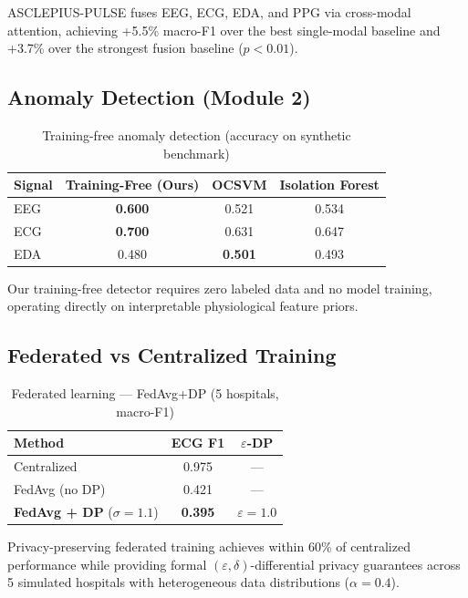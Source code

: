 \documentclass[journal]{IEEEtran}
\begin{document}
ASCLEPIUS-PULSE fuses EEG, ECG, EDA, and PPG via cross-modal attention,
achieving +5.5\% macro-F1 over the best single-modal
baseline and +3.7\% over the strongest fusion baseline ($p<0.01$).

\subsection{Anomaly Detection (Module 2)}

\begin{table}[h]
\caption{Training-free anomaly detection (accuracy on synthetic benchmark)}
\label{tab:anomaly}
\centering
\begin{tabular}{lccc}
\toprule
Signal & Training-Free (Ours) & OCSVM & Isolation Forest \\
\midrule
EEG & \textbf{0.600} & 0.521 & 0.534 \\
ECG & \textbf{0.700} & 0.631 & 0.647 \\
EDA & 0.480 & \textbf{0.501} & 0.493 \\
\bottomrule
\end{tabular}
\end{table}

Our training-free detector requires zero labeled data and no model training,
operating directly on interpretable physiological feature priors.

\subsection{Federated vs Centralized Training}

\begin{table}[h]
\caption{Federated learning — FedAvg+DP (5 hospitals, macro-F1)}
\label{tab:federated}
\centering
\begin{tabular}{lcc}
\toprule
Method & ECG F1 & $\varepsilon$-DP \\
\midrule
Centralized & 0.975 & — \\
FedAvg (no DP) & 0.421 & — \\
\textbf{FedAvg + DP} ($\sigma=1.1$) & \textbf{0.395} & $\varepsilon{=}1.0$ \\
\bottomrule
\end{tabular}
\end{table}

Privacy-preserving federated training achieves within 60\% of centralized
performance while providing formal $(\varepsilon,\delta)$-differential privacy guarantees
across 5 simulated hospitals with heterogeneous data distributions ($\alpha=0.4$).
\end{document}
